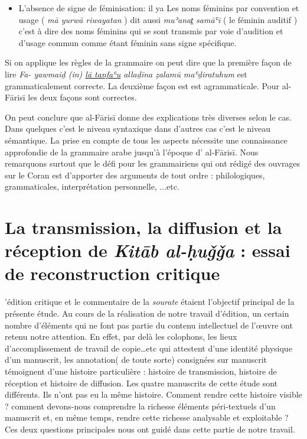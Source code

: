 \documentclass[a4paper,12pt]{report}
\begin{document}
\begin{itemize}
\begin{enumerate}
\begin{itemize}
    
    \item  L'absence de signe de féminisation:  il ya  Les noms féminins par  convention et usage  ( \textit{mā yurwā riwayatan} )  dit aussi \textit{ muʾanat̠ sam\=aʿ\=i}  ( le féminin auditif ) c'est à dire des noms féminins qui se sont transmis par voie d’audition et d’usage commun  comme étant  féminin sans  signe spécifique. 
\end{itemize}

Si on applique les règles de la grammaire  on peut dire que la première façon de lire     \textit {Fa- yawmaiḏ (in)  \underline {lā tanfaʿu} allaḏīna ẓalamū 
maʿḏiratuhum  } est  grammaticalement correcte. La deuxième façon est est agrammaticale. Pour al-F\=aris\=i les deux façons sont correctes.  

On peut conclure que  al-F\=aris\=i  donne des explications très diverses selon le cas. Dans quelques c'est le niveau  syntaxique dans d'autres cas c'est le niveau  sémantique. La prise en compte de tous les aspects nécessite une connaissance approfondie  de la grammaire arabe jusqu'à l'époque d' al-F\=aris\=i. Nous remarquons surtout que le défi pour les grammairiens qui ont rédigé des ouvrages sur le Coran est d'apporter des arguments de tout ordre : philologiques, grammaticales, interprétation personnelle, ...etc.   














\chapter{	La transmission, la diffusion  et la réception de \textit{Kitāb al-ḥuǧǧa} : essai de reconstruction  critique  }



’édition critique et le commentaire de la \textit{sourate} étaient l’objectif principal de la présente étude. Au cours de la réalisation de notre travail d’édition, un certain nombre d’éléments  qui ne font pas partie du contenu intellectuel de l'œuvre ont retenu notre attention. En effet, par delà les colophons, les lieux d’accomplissement de travail de copie…etc qui attestent d’une identité physique  d'un manuscrit, les annotation( de toute sorte) consignées sur manuscrit témoignent d'une histoire particulière : histoire de transmission, histoire de réception et histoire de diffusion. Les quatre manuscrits de cette étude sont différents. Ils n'ont pas eu  la même histoire. 
Comment rendre cette  histoire visible ? comment devons-nous comprendre la richesse éléments péri-textuels d'un manuscrit et, en même temps, rendre cette richesse analysable et exploitable ? Ces  deux questions principales  nous ont guidé dans cette partie de notre travail.


\end{enumerate}
\end{itemize}
\end{document}
